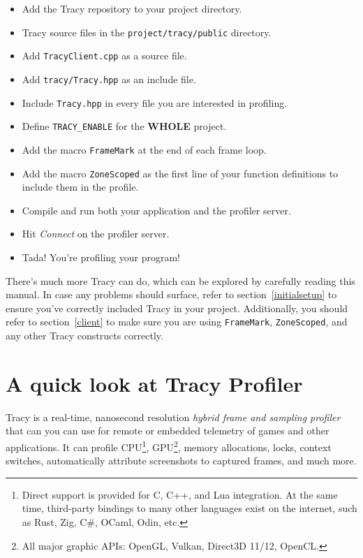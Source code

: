 \documentclass[hidelinks,titlepage,a4paper]{article}
\begin{document}
\begin{itemize}
\item Add the Tracy repository to your project directory.
\item Tracy source files in the \texttt{project/tracy/public} directory.
\item Add \texttt{TracyClient.cpp} as a source file.
\item Add \texttt{tracy/Tracy.hpp} as an include file.
\item Include \texttt{Tracy.hpp} in every file you are interested in profiling.
\item Define \texttt{TRACY\_ENABLE} for the \textbf{WHOLE} project.
\item Add the macro \texttt{FrameMark} at the end of each frame loop.
\item Add the macro \texttt{ZoneScoped} as the first line of your function definitions to include them in the profile.
\item Compile and run both your application and the profiler server.
\item Hit \emph{Connect} on the profiler server.
\item Tada! You're profiling your program!
\end{itemize}

There's much more Tracy can do, which can be explored by carefully reading this manual. In case any problems should surface, refer to section~\ref{initialsetup} to ensure you've correctly included Tracy in your project. Additionally, you should refer to section~\ref{client} to make sure you are using \texttt{FrameMark}, \texttt{ZoneScoped}, and any other Tracy constructs correctly.

\newpage

\tableofcontents

\newpage

\section{A quick look at Tracy Profiler}
\label{quicklook}

Tracy is a real-time, nanosecond resolution \emph{hybrid frame and sampling profiler} that can you can use for remote or embedded telemetry of games and other applications. It can profile CPU\footnote{Direct support is provided for C, C++, and Lua integration. At the same time, third-party bindings to many other languages exist on the internet, such as Rust, Zig, C\#, OCaml, Odin, etc.}, GPU\footnote{All major graphic APIs: OpenGL, Vulkan, Direct3D 11/12, OpenCL.}, memory allocations, locks, context switches, automatically attribute screenshots to captured frames, and much more.
\end{document}

